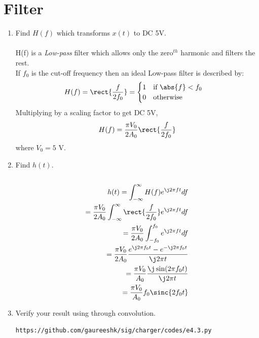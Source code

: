 \documentclass[journal,12pt,twocolumn]{IEEEtran}
\renewcommand\thesection{\arabic{section}}
\begin{document}
\section{Filter}
\begin{enumerate}[label=\thesection.\arabic*
,ref=\thesection.\theenumi]
\item Find $H(f)$ which transforms $x(t)$ to DC 5V.\\
\solution\\
H(f) is a \textit{Low-pass} filter which allows only the zero$^{th}$ harmonic and filters the rest.\\

If $f_0$ is the cut-off frequency then an ideal Low-pass filter is described by:
\begin{equation}
	H(f) = \rect{\frac{f}{2f_0}} = \begin{cases}
		1 \quad $if $ \abs{f} < f_0\\
		0 \quad $otherwise$
	\end{cases}
\end{equation}
Multiplying by a scaling factor to get DC 5V,
\begin{equation}
	H(f) = \frac{\pi V_0}{2A_0}\rect{\frac{f}{2f_0}}
		\label{eq:Hf}
\end{equation}
where $V_0 = 5$ V.
\item Find $h(t)$.\\
\solution\\
\begin{align}
	h(t) = \int_{-\infty}^{\infty} H(f)e^{\j2\pi f t}df\\
	= \frac{\pi V_0}{2A_0} \int_{-\infty}^{\infty}\rect{\frac{f}{2f_0}} e^{\j2\pi f t}df\\
	= \frac{\pi V_0}{2A_0} \int_{-f_0}^{f_0} e^{\j2\pi f t}df\\
	= \frac{\pi V_0}{2A_0} \dfrac{e^{\j2\pi f_0 t} - e^{-\j2\pi f_0 t}}{\j2\pi t}\\
	= \frac{\pi V_0}{A_0} \dfrac{\j\sin(2\pi f_0 t)}{\j2\pi t}\\
	= \frac{\pi V_0}{A_0} f_0\sinc{2f_0 t}
\end{align}
\item Verify your result using  through convolution.
\solution
\begin{lstlisting}
https://github.com/gaureeshk/sig/charger/codes/e4.3.py
\end{lstlisting}
\begin{figure}[!ht]
	\begin{center}

\end{center}
\end{figure}
\end{enumerate}
\end{document}
